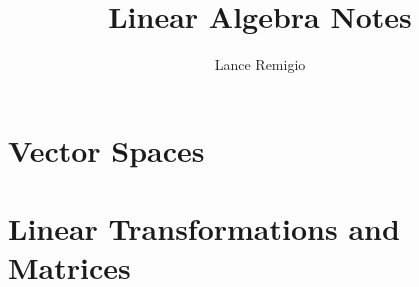 \documentclass[11pt,a4paper]{book}
\title{Linear Algebra Notes}
\author{Lance Remigio}
\begin{document}
\maketitle
\tableofcontents
\listoftheorems[ignoreall,show={theorem,defn}]
\chapter{Vector Spaces}











\chapter{Linear Transformations and Matrices}








\end{document}
